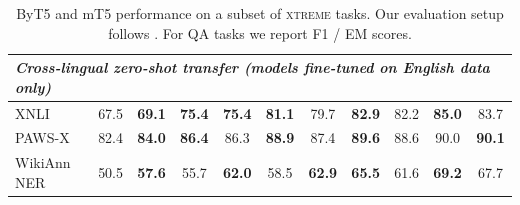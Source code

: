 \begin{table}[t!]
{\begin{tabular}{l cc cc cc cc cc}
\midrule %
\multicolumn{11}{l}{\emph{Cross-lingual zero-shot transfer (models fine-tuned on English data only)}} \\
\midrule %
XNLI   & 67.5        & \textbf{69.1}        & \textbf{75.4}                 & \textbf{75.4}        & \textbf{81.1}        & 79.7        & \textbf{82.9}        & 82.2        & \textbf{85.0}        & 83.7          \\
PAWS-X  & 82.4        & \textbf{84.0}          & \textbf{86.4}                 & 86.3                 & \textbf{88.9}        & 87.4        & \textbf{89.6}        & 88.6        & 90.0                 & \textbf{90.1} \\
WikiAnn NER & 50.5        & \textbf{57.6} & 55.7        & \textbf{62.0} & 58.5        & \textbf{62.9} & \textbf{65.5} & 61.6        & \textbf{69.2} & 67.7 \\
\bottomrule
\end{tabular}
}
\caption{ByT5 and mT5 performance on a subset of \textsc{xtreme} tasks. Our evaluation setup follows \citet{mt5}. For QA tasks we report F1 / EM scores.}
\label{tab:xtreme}
\end{table}